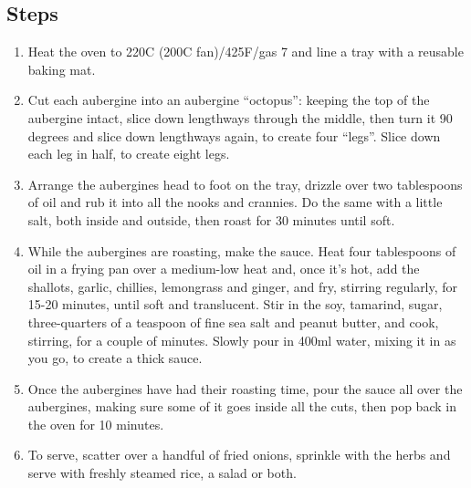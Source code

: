 \documentclass{book}
\begin{document}
\subsection*{Steps}
\begin{enumerate}
\item Heat the oven to 220C (200C fan)/425F/gas 7 and line a tray with a reusable baking mat.
\item Cut each aubergine into an aubergine “octopus”: keeping the top of the aubergine intact, slice down lengthways through the middle, then turn it 90 degrees and slice down lengthways again, to create four “legs”. Slice down each leg in half, to create eight legs.
\item Arrange the aubergines head to foot on the tray, drizzle over two tablespoons of oil and rub it into all the nooks and crannies. Do the same with a little salt, both inside and outside, then roast for 30 minutes until soft.
\item While the aubergines are roasting, make the sauce. Heat four tablespoons of oil in a frying pan over a medium-low heat and, once it’s hot, add the shallots, garlic, chillies, lemongrass and ginger, and fry, stirring regularly, for 15-20 minutes, until soft and translucent. Stir in the soy, tamarind, sugar, three-quarters of a teaspoon of fine sea salt and peanut butter, and cook, stirring, for a couple of minutes. Slowly pour in 400ml water, mixing it in as you go, to create a thick sauce.
\item Once the aubergines have had their roasting time, pour the sauce all over the aubergines, making sure some of it goes inside all the cuts, then pop back in the oven for 10 minutes.
\item To serve, scatter over a handful of fried onions, sprinkle with the herbs and serve with freshly steamed rice, a salad or both.
\end{enumerate}
\newpage
\end{document}
